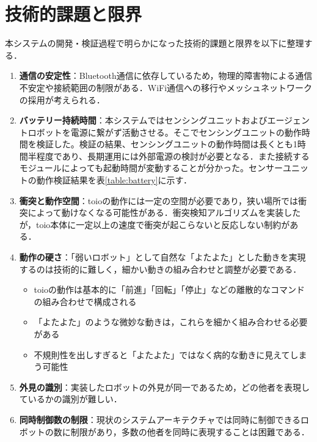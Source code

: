 \documentclass{cuxarticle}
\begin{document}
\section{技術的課題と限界}
本システムの開発・検証過程で明らかになった技術的課題と限界を以下に整理する．

\begin{enumerate}
  \item \textbf{通信の安定性}：Bluetooth通信に依存しているため，物理的障害物による通信不安定や接続範囲の制限がある．WiFi通信への移行やメッシュネットワークの採用が考えられる．

  \item \textbf{バッテリー持続時間}：本システムではセンシングユニットおよびエージェントロボットを電源に繋がず活動させる。そこでセンシングユニットの動作時間を検証した。検証の結果、センシングユニットの動作時間は長くとも1時間半程度であり、長期運用には外部電源の検討が必要となる．また接続するモジュールによっても起動時間が変動することが分かった。センサーユニットの動作検証結果を表\ref{table:battery}に示す．

  \item \textbf{衝突と動作空間}：toioの動作には一定の空間が必要であり，狭い場所では衝突によって動けなくなる可能性がある．衝突検知アルゴリズムを実装したが，toio本体に一定以上の速度で衝突が起こらないと反応しない制約がある．

  \item \textbf{動作の硬さ}：「弱いロボット」として自然な「よたよた」とした動きを実現するのは技術的に難しく，細かい動きの組み合わせと調整が必要である．
    \begin{itemize}
      \item toioの動作は基本的に「前進」「回転」「停止」などの離散的なコマンドの組み合わせで構成される
      \item 「よたよた」のような微妙な動きは，これらを細かく組み合わせる必要がある
      \item 不規則性を出しすぎると「よたよた」ではなく病的な動きに見えてしまう可能性
    \end{itemize}

  \item \textbf{外見の識別}：実装したロボットの外見が同一であるため，どの他者を表現しているかの識別が難しい．

  \item \textbf{同時制御数の制限}：現状のシステムアーキテクチャでは同時に制御できるロボットの数に制限があり，多数の他者を同時に表現することは困難である．
\end{enumerate}
\end{document}
